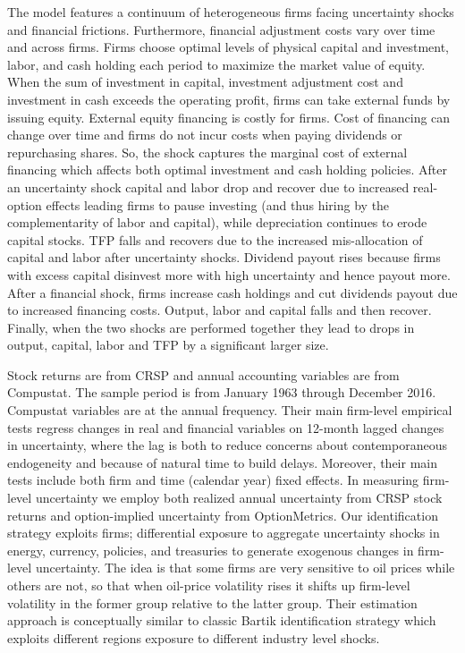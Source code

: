 \documentclass{article}
\begin{document}
{The model features a continuum of heterogeneous firms facing uncertainty shocks and financial frictions. Furthermore, financial adjustment costs vary over time and across firms. Firms choose optimal levels of physical capital and investment, labor, and cash holding each period to maximize the market value of equity. When the sum of investment in capital, investment adjustment cost and investment in cash exceeds the operating profit, firms can take external funds by issuing equity. External equity financing is costly for firms. Cost of financing can change over time and firms do not incur costs when paying dividends or repurchasing shares. So, the shock captures the marginal cost of external financing which affects both optimal investment and cash holding policies. After an uncertainty shock capital and labor drop and recover due to increased real-option effects leading firms to pause investing (and thus hiring by the complementarity of labor and capital), while depreciation continues to erode capital stocks. TFP falls and recovers due to the increased mis-allocation of capital and labor after uncertainty shocks. Dividend payout rises because firms with excess capital disinvest more with high uncertainty and hence payout more. After a financial shock, firms increase cash holdings and cut dividends payout due to increased financing costs. Output, labor and capital falls and then recover. Finally, when the two shocks are performed together they lead to drops in output, capital, labor and TFP by a significant larger size. 

Stock returns are from CRSP and annual accounting variables are from Compustat. The sample period is from January 1963 through December 2016. Compustat variables are at the annual frequency. Their main firm-level empirical tests regress changes in real and financial variables on 12-month lagged changes in uncertainty, where the lag is both to reduce concerns about contemporaneous endogeneity and because of natural time to build delays. Moreover, their main tests include both firm and time (calendar year) fixed effects. In measuring firm-level uncertainty we employ both realized annual uncertainty from CRSP stock returns and option-implied uncertainty from OptionMetrics. Our identification strategy exploits firms; differential exposure to aggregate uncertainty shocks in energy, currency, policies, and treasuries to generate exogenous changes in firm-level uncertainty. The idea is that some firms are very sensitive to oil prices while others are not, so that when oil-price volatility rises it shifts up firm-level volatility in the former group relative to the latter group. Their estimation approach is conceptually similar to classic Bartik identification strategy which exploits different regions exposure to different industry level shocks. 

}
\end{document}
